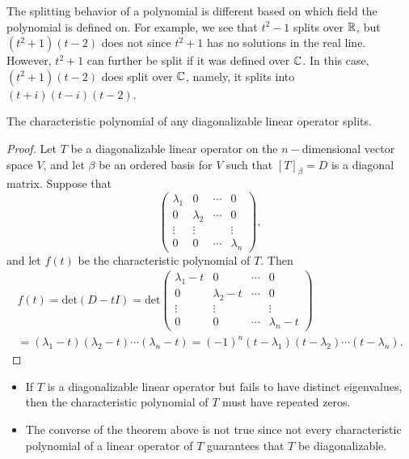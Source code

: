 The splitting behavior of a polynomial is different based on which field the polynomial is defined on. For example, we see that \( t^{2} - 1  \) splits over \( \mathbb{R}  \), but \( (t^{2} + 1)(t-2) \) does not since \( t^{2} + 1  \) has no solutions in the real line. However, \( t^{2} + 1  \) can further be split if it was defined over \( \mathbb{C}  \). In this case, \( (t^{2} +1)(t-2) \) does split over \( \mathbb{C}  \), namely, it splits into \( (t+i)(t-i)(t-2) \).

\begin{theorem}
   The characteristic polynomial of any diagonalizable linear operator splits.
\end{theorem}
\begin{proof}
Let \( T  \) be a diagonalizable linear operator on the \( n- \)dimensional vector space \( V  \), and let \( \beta \) be an ordered basis for \( V  \) such that \( [T]_{\beta} = D  \) is a diagonal matrix. Suppose that  
\[ \begin{pmatrix} 
{\lambda}_{1} & 0 & \cdots & 0 \\
0  & {\lambda}_{2} & \cdots & 0 \\
\vdots & \vdots &   & \vdots \\  
0 & 0 & \cdots & {\lambda}_{n}
\end{pmatrix}, \]
and let \( f(t)  \) be the characteristic polynomial of \( T  \). Then
\begin{align*} 
    f(t) = \text{det}(D - tI) = \text{det} \begin{pmatrix} 
{\lambda}_{1} - t  & 0 & \cdots & 0 \\
0  & {\lambda}_{2} - t & \cdots & 0 \\
\vdots & \vdots &   & \vdots \\  
0 & 0 & \cdots & {\lambda}_{n} - t
\end{pmatrix} \\  
= ({\lambda}_{1} - t)({\lambda}_{2} -t)\cdots ({\lambda}_{n} -t) = (-1)^{n}(t - {\lambda}_{1})(t - {\lambda}_{2})\cdots(t- {\lambda}_{n}). 
    \end{align*}
\end{proof}
\begin{itemize}
    \item If \( T  \) is a diagonalizable linear operator but fails to have distinct eigenvalues, then the characteristic polynomial of \( T  \) must have repeated zeros.
    \item The converse of the theorem above is not true since not every characteristic polynomial of a linear operator of \( T  \) guarantees that \( T  \) be diagonalizable.
\end{itemize}

